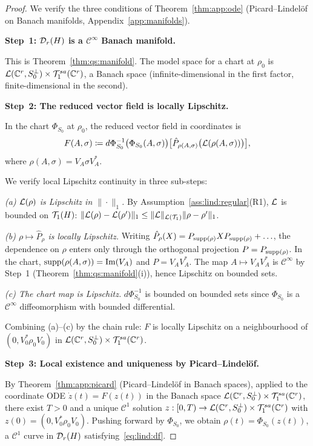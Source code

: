 \begin{proof}
We verify the three conditions of Theorem~\ref{thm:app:ode} (Picard--Lindelöf
on Banach manifolds, Appendix~\ref{app:manifolds}).

\medskip
\noindent\textbf{Step~1: $\mathcal{D}_{r}(H)$ is a $\mathcal{C}^\infty$ Banach manifold.}

This is Theorem~\ref{thm:qs:manifold}. The model space for a chart at
$\rho_0$ is $\mathcal{L}(\mathbb{C}^r, S_0^\perp) \times \mathcal{T}_{1}^{sa}(\mathbb{C}^r)$, a Banach
space (infinite-dimensional in the first factor, finite-dimensional in
the second).

\medskip
\noindent\textbf{Step~2: The reduced vector field is locally Lipschitz.}

In the chart $\Phi_{S_0}$ at $\rho_0$, the reduced vector field
in coordinates is
\begin{equation*}
    F(A, \sigma)
    \coloneqq d\Phi_{S_0}^{-1}\bigl(\Phi_{S_0}(A,\sigma)\bigr)
    \bigl[\hat P_{\rho(A,\sigma)}\bigl(\mathcal{L}(\rho(A,\sigma))\bigr)\bigr],
\end{equation*}
where $\rho(A,\sigma) = V_A \sigma V_A^*$.

We verify local Lipschitz continuity in three sub-steps:

\emph{(a) $\mathcal{L}(\rho)$ is Lipschitz in $\|\cdot\|_1$.}
By Assumption~\ref{ass:lind:regular}(R1), $\mathcal{L}$ is bounded on
$\mathcal{T}_{1}(H)$: $\|\mathcal{L}(\rho) - \mathcal{L}(\rho')\|_1 \leq \|\mathcal{L}\|_{\mathcal{L}(\mathcal{T}_{1})}
\|\rho - \rho'\|_1$.

\emph{(b) $\rho \mapsto \hat P_\rho$ is locally Lipschitz.}
Writing $\hat P_\rho(X) = P_{\mathrm{supp}(\rho)} X P_{\mathrm{supp}(\rho)} + \ldots$,
the dependence on $\rho$ enters only through the orthogonal projection
$P = P_{\mathrm{supp}(\rho)}$. In the chart, $\mathrm{supp}(\rho(A,\sigma)) =
\mathrm{Im}(V_A)$ and $P = V_A V_A^*$. The map $A \mapsto V_A V_A^*$
is $\mathcal{C}^\infty$ by Step~1 (Theorem~\ref{thm:qs:manifold}(i)),
hence Lipschitz on bounded sets.

\emph{(c) The chart map is Lipschitz.}
$d\Phi_{S_0}^{-1}$ is bounded on bounded sets since $\Phi_{S_0}$ is a
$\mathcal{C}^\infty$ diffeomorphism with bounded differential.

Combining (a)--(c) by the chain rule: $F$ is locally Lipschitz on
a neighbourhood of $(0, V_0^*\rho_0 V_0)$ in $\mathcal{L}(\mathbb{C}^r, S_0^\perp)
\times \mathcal{T}_{1}^{sa}(\mathbb{C}^r)$.

\medskip
\noindent\textbf{Step~3: Local existence and uniqueness by Picard--Lindelöf.}

By Theorem~\ref{thm:app:picard} (Picard--Lindelöf in Banach spaces),
applied to the coordinate ODE $\dot z(t) = F(z(t))$ in the Banach space
$\mathcal{L}(\mathbb{C}^r, S_0^\perp) \times \mathcal{T}_{1}^{sa}(\mathbb{C}^r)$, there exist $T > 0$ and
a unique $\mathcal{C}^1$ solution $z: [0,T) \to \mathcal{L}(\mathbb{C}^r, S_0^\perp)
\times \mathcal{T}_{1}^{sa}(\mathbb{C}^r)$ with $z(0) = (0, V_0^*\rho_0 V_0)$.
Pushing forward by $\Phi_{S_0}$, we obtain $\rho(t) = \Phi_{S_0}(z(t))$,
a $\mathcal{C}^1$ curve in $\mathcal{D}_{r}(H)$ satisfying~\eqref{eq:lind:df}.


\end{proof}

